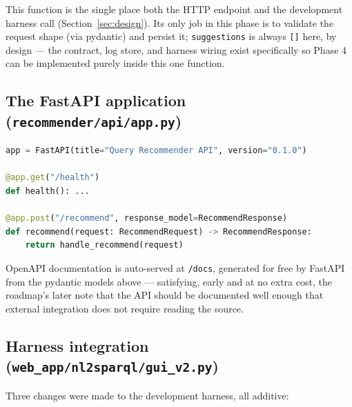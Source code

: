 \documentclass[11pt,a4paper]{article}
\newcommand{\code}[1]{\texttt{#1}}
\begin{document}
This function is the single place both the HTTP endpoint and the development harness call
(Section~\ref{sec:design}). Its only job in this phase is to validate the request shape (via
pydantic) and persist it; \code{suggestions} is always \code{[]} here, by design --- the contract,
log store, and harness wiring exist specifically so Phase 4 can be implemented purely inside this
one function.

\subsection{The FastAPI application (\code{recommender/api/app.py})}

\begin{lstlisting}[language=Python, caption={The HTTP surface: a thin FastAPI wrapper around
\code{handle\_recommend()}. Run with \code{uvicorn recommender.api.app:app --reload --port 8000}
from the repo root.}]
app = FastAPI(title="Query Recommender API", version="0.1.0")

@app.get("/health")
def health(): ...

@app.post("/recommend", response_model=RecommendResponse)
def recommend(request: RecommendRequest) -> RecommendResponse:
    return handle_recommend(request)
\end{lstlisting}

OpenAPI documentation is auto-served at \code{/docs}, generated for free by FastAPI from the
pydantic models above --- satisfying, early and at no extra cost, the roadmap's later note that
the API should be documented well enough that external integration does not require reading the
source.

\subsection{Harness integration (\code{web\_app/nl2sparql/gui\_v2.py})}

Three changes were made to the development harness, all additive:
\end{document}
